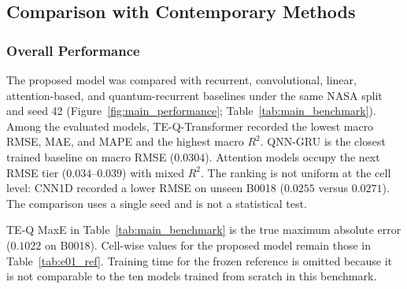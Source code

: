 \subsection{Comparison with Contemporary Methods}
\label{sec:contemporary_comparison}

\subsubsection{Overall Performance}
\label{sec:overall_benchmark}

The proposed model was compared with recurrent, convolutional, linear, attention-based, and quantum-recurrent baselines under the same NASA split and seed 42 (Figure~\ref{fig:main_performance}; Table~\ref{tab:main_benchmark}). Among the evaluated models, TE-Q-Transformer recorded the lowest macro RMSE, MAE, and MAPE and the highest macro $R^2$. QNN-GRU is the closest trained baseline on macro RMSE ($0.0304$). Attention models occupy the next RMSE tier ($0.034$--$0.039$) with mixed $R^2$. The ranking is not uniform at the cell level: CNN1D recorded a lower RMSE on unseen B0018 ($0.0255$ versus $0.0271$). The comparison uses a single seed and is not a statistical test.

TE-Q MaxE in Table~\ref{tab:main_benchmark} is the true maximum absolute error ($0.1022$ on B0018). Cell-wise values for the proposed model remain those in Table~\ref{tab:e01_ref}. Training time for the frozen reference is omitted because it is not comparable to the ten models trained from scratch in this benchmark.


